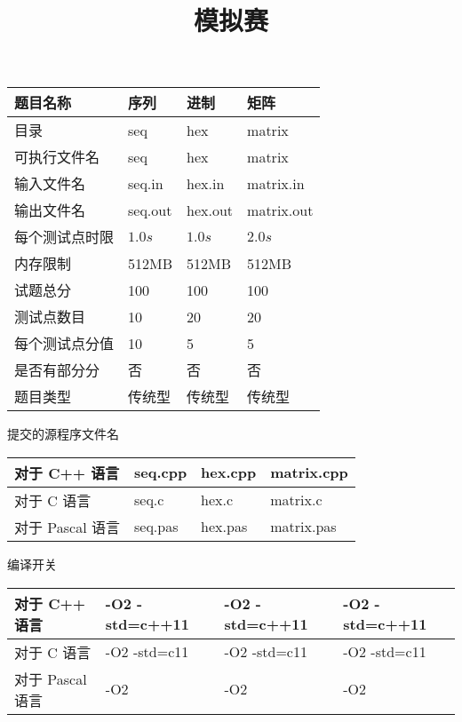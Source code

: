 ﻿\documentclass[12pt, a4paper]{article}
\title{模拟赛}
\begin{document}
\maketitle
\begin{center}
\begin{tabular}{|p{90pt}|p{90pt}|p{90pt}|p{90pt}|}
	\hline
	题目名称 & 序列 & 进制 & 矩阵 \\
	\hline
	目录 & seq & hex & matrix \\
	\hline
	可执行文件名 & seq & hex & matrix \\
	\hline
	输入文件名 & seq.in & hex.in & matrix.in \\
	\hline
	输出文件名 & seq.out & hex.out & matrix.out \\
	\hline
	每个测试点时限 & $1.0s$ & $1.0s$ & $2.0s$ \\
	\hline
	内存限制 & 512MB & 512MB & 512MB \\
	\hline
	试题总分 & 100 & 100 & 100 \\
	\hline
	测试点数目 & 10 & 20 & 20 \\
	\hline
	每个测试点分值 & 10 & 5 & 5 \\
	\hline
	是否有部分分 & 否 & 否 & 否\\
	\hline
	题目类型 & 传统型 & 传统型 & 传统型\\
     \hline
\end{tabular}

提交的源程序文件名

\begin{tabular}{|p{90pt}|p{90pt}|p{90pt}|p{90pt}|}
	\hline
	对于 C++ 语言 & seq.cpp & hex.cpp & matrix.cpp \\
	\hline
	对于 C 语言 & seq.c & hex.c & matrix.c \\
	\hline
	对于 Pascal 语言 & seq.pas & hex.pas & matrix.pas \\
	\hline
\end{tabular}

编译开关

\begin{tabular}{|p{90pt}|p{90pt}|p{90pt}|p{90pt}|}
	\hline
	对于 C++ 语言 & -O2 -std=c++11 & -O2 -std=c++11 & -O2 -std=c++11 \\
	\hline
	对于 C 语言 & -O2 -std=c11 & -O2 -std=c11 & -O2 -std=c11 \\
	\hline
	对于 Pascal 语言 & -O2 & -O2& -O2 \\
	\hline
\end{tabular}

\end{center}
\begin{center}
\end{center}
\end{document}

